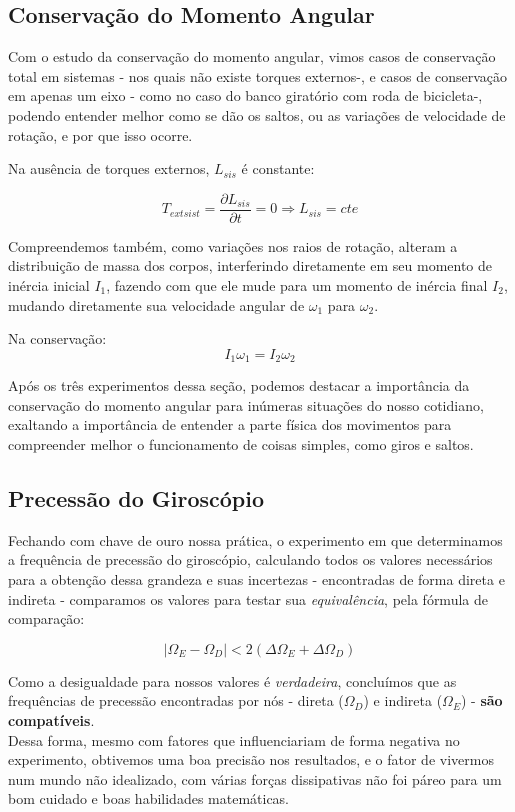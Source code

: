 
\subsection{Conservação do Momento Angular}

Com o estudo da conservação do momento angular, vimos casos de conservação total em sistemas - nos quais não existe torques externos-, e casos de conservação em apenas um eixo - como no caso do banco giratório com roda de bicicleta-, podendo entender melhor como se dão os saltos, ou as variações de velocidade de rotação, e por que isso ocorre. 

Na ausência de torques externos, $L_{sis}$ é constante:

\[T_{ext sist} = \frac{\partial L_{sis}}{\partial t} = 0 \Rightarrow L_{sis} = cte\]

Compreendemos também, como variações nos raios de rotação, alteram a distribuição de massa dos corpos, interferindo diretamente em seu  momento de inércia inicial $I_1$, fazendo com que ele mude para um momento de inércia final $I_2$, mudando diretamente sua velocidade angular de $\omega_1$ para $\omega_2$.

Na conservação:
\[I_1 \omega_1 = I_2 \omega_2\]

Após os três experimentos dessa seção, podemos destacar a importância da conservação do momento angular para inúmeras situações do nosso cotidiano, exaltando a importância de entender a parte física dos movimentos para compreender melhor o funcionamento de coisas simples, como giros e saltos. 


\subsection{Precessão do Giroscópio}

Fechando com chave de ouro nossa prática, o experimento em que determinamos a frequência de precessão do giroscópio, calculando todos os valores necessários para a obtenção dessa grandeza e suas incertezas - encontradas de forma direta e indireta - comparamos os valores para testar sua \textit{equivalência}, pela fórmula de comparação:

\[| \Omega _E - \Omega _D | < 2 (\Delta \Omega _E + \Delta \Omega _D)\]

Como a desigualdade para nossos valores é \textit{verdadeira}, concluímos que as frequências de precessão encontradas por nós - direta ($\Omega _D$) e indireta ($\Omega _E$) - \textbf{são compatíveis}.\\

Dessa forma, mesmo com fatores que influenciariam de forma negativa no experimento, obtivemos uma boa precisão nos resultados, e o fator de vivermos num mundo não idealizado, com várias forças dissipativas não foi páreo para um bom cuidado e boas habilidades matemáticas.
